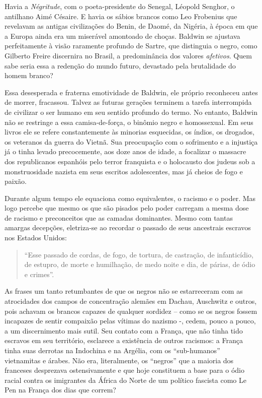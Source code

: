 \documentclass[
  letterpaper,
  DIV=11,
  numbers=noendperiod]{scrreprt}
\begin{document}
Havia a \emph{Négritude}, com o poeta-presidente do Senegal, Léopold
Senghor, o antilhano Aimé Césaire. E havia os sábios brancos como Leo
Frobenius que revelavam as antigas civilizações do Benin, de Daomé, da
Nigéria, à época em que a Europa ainda era um miserável amontoado de
choças. Baldwin se ajustava perfeitamente à visão raramente profundo de
Sartre, que distinguia o negro, como Gilberto Freire discernira no
Brasil, a predominância dos valores \emph{afetivos}. Quem sabe seria
essa a redenção do mundo futuro, devastado pela brutalidade do homem
branco?

Essa desesperada e fraterna emotividade de Baldwin, ele próprio
reconheceu antes de morrer, fracassou. Talvez as futuras gerações
terminem a tarefa interrompida de civilizar o ser humano em seu sentido
profundo do termo. No entanto, Baldwin não se restringe a essa
camisa-de-força, o binômio negro e homossexual. Em seus livros ele se
refere constantemente às minorias esquecidas, os índios, os drogados, os
veteranos da guerra do Vietnã. Sua preocupação com o sofrimento e a
injustiça já o tinha levado precocemente, aos doze anos de idade, a
focalizar o massacre dos republicanos espanhóis pelo terror franquista e
o holocausto dos judeus sob a monstruosidade nazista em seus escritos
adolescentes, mas já cheios de fogo e paixão.

Durante algum tempo ele equaciona como equivalentes, o racismo e o
poder. Mas logo percebe que mesmo os que são pisados pelo poder carregam
a mesma dose de racismo e preconceitos que as camadas dominantes. Mesmo
com tantas amargas decepções, eletriza-se ao recordar o passado de seus
ancestrais escravos nos Estados Unidos:

\begin{quote}
``Esse passado de cordas, de fogo, de tortura, de castração, de
infanticídio, de estupro, de morte e humilhação, de medo noite e dia, de
párias, de ódio e crimes''.
\end{quote}

As frases um tanto retumbantes de que os negros não se estarreceram com
as atrocidades dos campos de concentração alemães em Dachau, Auschwitz e
outros, pois achavam os brancos capazes de qualquer sordidez -- como se
os negros fossem incapazes de sentir compaixão pelas vítimas do nazismo
-, cedem, pouco a pouco, a um discernimento mais sutil. Seu contato com
a França, que não tinha tido escravos em seu território, esclarece a
existência de outros racismos: a França tinha suas derrotas na Indochina
e na Argélia, com os ``sub-humanos'' vietnamitas e árabes. Não era,
literalmente, os ``negros'' que a maioria dos franceses desprezava
ostensivamente e que hoje constituem a base para o ódio racial contra os
imigrantes da África do Norte de um político fascista como Le Pen na
França dos dias que correm?
\end{document}
